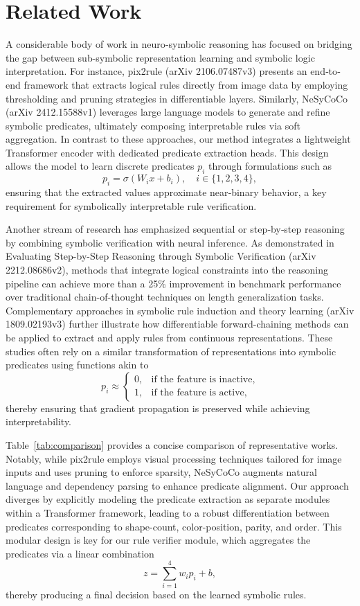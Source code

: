 \documentclass{article}
\begin{document}
\section{Related Work}
A considerable body of work in neuro‐symbolic reasoning has focused on bridging the gap between sub-symbolic representation learning and symbolic logic interpretation. For instance, pix2rule (arXiv 2106.07487v3) presents an end‐to‐end framework that extracts logical rules directly from image data by employing thresholding and pruning strategies in differentiable layers. Similarly, NeSyCoCo (arXiv 2412.15588v1) leverages large language models to generate and refine symbolic predicates, ultimately composing interpretable rules via soft aggregation. In contrast to these approaches, our method integrates a lightweight Transformer encoder with dedicated predicate extraction heads. This design allows the model to learn discrete predicates \(p_i\) through formulations such as 
\[
p_i = \sigma(W_i x + b_i), \quad i \in \{1,2,3,4\},
\]
ensuring that the extracted values approximate near‐binary behavior, a key requirement for symbolically interpretable rule verification.

Another stream of research has emphasized sequential or step‐by‐step reasoning by combining symbolic verification with neural inference. As demonstrated in Evaluating Step-by-Step Reasoning through Symbolic Verification (arXiv 2212.08686v2), methods that integrate logical constraints into the reasoning pipeline can achieve more than a 25\% improvement in benchmark performance over traditional chain-of-thought techniques on length generalization tasks. Complementary approaches in symbolic rule induction and theory learning (arXiv 1809.02193v3) further illustrate how differentiable forward-chaining methods can be applied to extract and apply rules from continuous representations. These studies often rely on a similar transformation of representations into symbolic predicates using functions akin to 
\[
p_i \approx 
\begin{cases}
0, & \text{if the feature is inactive,} \\
1, & \text{if the feature is active,}
\end{cases}
\]
thereby ensuring that gradient propagation is preserved while achieving interpretability.

Table~\ref{tab:comparison} provides a concise comparison of representative works. Notably, while pix2rule employs visual processing techniques tailored for image inputs and uses pruning to enforce sparsity, NeSyCoCo augments natural language and dependency parsing to enhance predicate alignment. Our approach diverges by explicitly modeling the predicate extraction as separate modules within a Transformer framework, leading to a robust differentiation between predicates corresponding to shape-count, color-position, parity, and order. This modular design is key for our rule verifier module, which aggregates the predicates via a linear combination 
\[
z = \sum_{i=1}^4 w_i p_i + b,
\]
thereby producing a final decision based on the learned symbolic rules.
\end{document}
